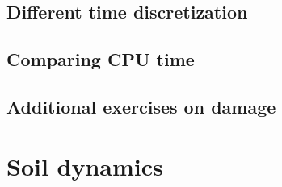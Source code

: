 \subsection{Different time discretization}

{
	\renewcommand{\subsection}{\subsubsection}
	
}

\subsection{Comparing CPU time}

{
	\renewcommand{\subsection}{\subsubsection}
	
}

\subsection{Additional exercises on damage}
{
	\renewcommand{\subsection}{\subsubsection}
	
}


\pagebreak

\section{Soil dynamics}

{
	\renewcommand{\subsection}{\subsubsection}
	
}


